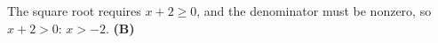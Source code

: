 The square root requires $x+2\ge0$, and the denominator must be nonzero, so $x+2>0$: $x>-2$. \textbf{(B)}
